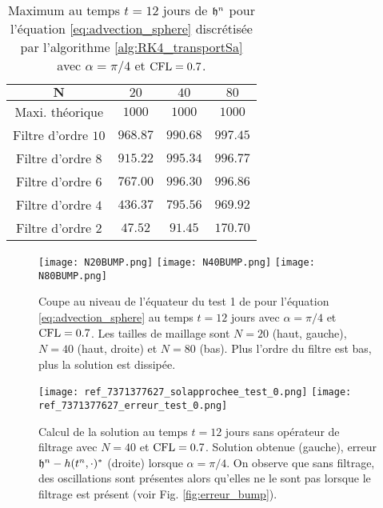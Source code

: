 \begin{table}[htbp]
\begin{center}
\begin{tabular}{|c||ccc|}
\hline 
$\mathbf{N}$ & $20$ & $40$ & $80$ \\ 
\hline 
\hline 
Maxi. théorique & $1000$ & $1000$ & $1000$ \\ 
Filtre d'ordre $10$ & $968.87$ & $990.68$ & $997.45$ \\ 
Filtre d'ordre $8$ & $915.22$ & $995.34$ & $996.77$ \\ 
Filtre d'ordre $6$ & $767.00$ & $996.30$ & $996.86$ \\  
Filtre d'ordre $4$ & $436.37$ & $795.56$ & $969.92$ \\ 
Filtre d'ordre $2$ & $47.52$ & $91.45$ & $170.70$ \\ 
\hline 
\end{tabular} 
\end{center}
\caption{Maximum au temps $t=12$ jours de $\mathfrak{h}^n$ pour l'équation \eqref{eq:advection_sphere} discrétisée par l'algorithme \ref{alg:RK4_transportSa} avec $\alpha = \pi / 4$ et $\text{CFL} = 0.7$.}
\label{tab:max_bump}
\end{table} 

\begin{figure}[htbp]
\begin{center}
\texttt{[image: N20BUMP.png]}
\texttt{[image: N40BUMP.png]}
\texttt{[image: N80BUMP.png]}
\end{center}
\caption{Coupe au niveau de l'équateur du test 1 de \cite{Williamson1992} pour l'équation \eqref{eq:advection_sphere} au temps $t=12$ jours avec $\alpha = \pi / 4$ et $\text{CFL} = 0.7$. Les tailles de maillage sont $N=20$ (haut, gauche), $N=40$ (haut, droite) et $N=80$ (bas). Plus l'ordre du filtre est bas, plus la solution est dissipée.}
\label{fig:max_bump}
\end{figure}

\begin{figure}[htbp]
\begin{center}
\texttt{[image: ref\_7371377627\_solapprochee\_test\_0.png]}
\texttt{[image: ref\_7371377627\_erreur\_test\_0.png]}
\end{center}
\caption{Calcul de la solution au temps $t=12$ jours sans opérateur de filtrage avec $N=40$ et $\text{CFL} = 0.7$. Solution obtenue (gauche), erreur $\mathfrak{h}^n - h(t^n,\cdot)^*$ (droite) lorsque $\alpha = \pi/4$. On observe que sans filtrage, des oscillations sont présentes alors qu'elles ne le sont pas lorsque le filtrage est présent (voir Fig. \ref{fig:erreur_bump}).}
\label{fig:parasite_bump}
\end{figure}








